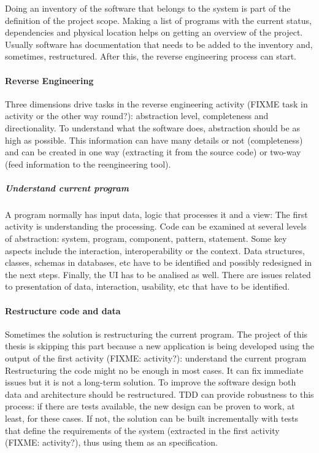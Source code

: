 Doing an inventory of the software that belongs to the system is part of the definition of the project scope.
Making a list of programs with the current status, dependencies and physical location helps on getting an overview of the project.
Usually software has documentation that needs to be added to the inventory and, sometimes, restructured.
After this, the reverse engineering process can start.

\paragraph{Reverse Engineering}
Three dimensions drive tasks in the reverse engineering activity (FIXME task in activity or the other way round?): abstraction level, completeness and directionality.
To understand what the software does, abstraction should be as high as possible.
This information can have many details or not (completeness) and can be created in one way (extracting it from the source code) or two-way (feed information to the reengineering tool).

\subparagraph{Understand current program}
A program normally has input data, logic that processes it and a view:
The first activity is understanding the processing.
Code can be examined at several levels of abstraction: system, program, component, pattern, statement.
Some key aspects include the interaction, interoperability or the context.
Data structures, classes, schemas in databases, etc have to be identified and possibly redesigned in the next steps.
Finally, the \ac{UI} has to be analised as well. 
There are issues related to presentation of data, interaction, usability, etc that have to be identified.

\paragraph{Restructure code and data}
Sometimes the solution is restructuring the current program.
The project of this thesis is skipping this part because a new application is being developed using the output of the first activity (FIXME: activity?): understand the current program
Restructuring the code might no be enough in most cases. 
It can fix immediate issues but it is not a long-term solution.
To improve the software design both data and architecture should be restructured.
\ac{TDD} can provide robustness to this process: if there are tests available, the new design can be proven to work, at least, for these cases. If not, the solution can be built incrementally with tests that define the requirements of the system (extracted in the first activity (FIXME: activity?), thus using them as an specification.

